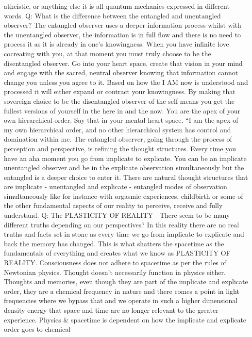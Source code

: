 atheistic, or anything else it is all quantum mechanics expressed in
different words. Q: What is the difference between the entangled and
unentangled observer? The entangled observer uses a deeper information
process whilst with the unentangled observer, the information is in full
flow and there is no need to process it as it is already in one's
knowingness. When you have infinite love cocreating with you, at that
moment you must truly choose to be the disentangled observer. Go into
your heart space, create that vision in your mind and engage with the
sacred, neutral observer knowing that information cannot change you
unless you agree to it. Based on how the I AM now is understood and
processed it will either expand or contract your knowingness. By making
that sovereign choice to be the disentangled observer of the self means
you get the fullest versions of yourself in the here in and the now. You
are the apex of your own hierarchical order. Say that in your mental
heart space. ``I am the apex of my own hierarchical order, and no other
hierarchical system has control and domination within me. The entangled
observer, going through the process of perception and perspective, is
refining the thought structures. Every time you have an aha moment you
go from implicate to explicate. You can be an implicate unentangled
observer and be in the explicate observation simultaneously but the
entangled is a deeper choice to enter it. There are natural thought
structures that are implicate - unentangled and explicate - entangled
modes of observation simultaneously like for instance with orgasmic
experiences, childbirth or some of the other fundamental aspects of our
reality to perceive, receive and fully understand. Q: The PLASTICITY OF
REALITY - There seem to be many different truths depending on our
perspectives? In this reality there are no real truths and facts set in
stone as every time we go from implicate to explicate and back the
memory has changed. This is what shatters the spacetime as the
fundamentals of everything and creates what we know as PLASTICITY OF
REALITY. Consciousness does not adhere to spacetime as per the rules of
Newtonian physics. Thought doesn't necessarily function in physics
either. Thoughts and memories, even though they are part of the
implicate and explicate order, they are a chemical frequency in nature
and there comes a point in light frequencies where we bypass that and we
operate in such a higher dimensional density energy that space and time
are no longer relevant to the greater experience. Physics \& spacetime
is dependent on how the implicate and explicate order goes to chemical
